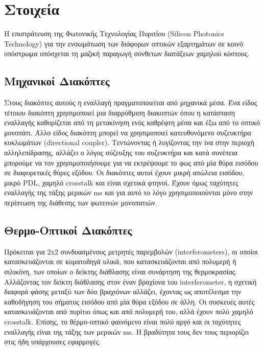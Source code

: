 
\section{Στοιχεία}



Η επιστράτευση της Φωτονικής Τεχνολογίας Πυριτίου (Silicon Photonics
Technology) για την ενσωμάτωση των διάφορων οπτικών εξαρτημάτων σε
κοινό υπόστρωμα υπόσχεται τη μαζική παραγωγή σύνθετων διατάξεων
χαμηλού κόστους.

\subsection{Μηχανικοί Διακόπτες}

Στους διακόπτες αυτούς η εναλλαγή πραγματοποιείται από μηχανικά
μέσα. Ένα είδος τέτοιου διακόπτη χρησιμοποιεί μια διαρρύθμιση
διακοπτών όπου η κατάσταση εναλλαγής καθορίζεται από τη μετακίνηση
ενός καθρέφτη μέσα και έξω από το οπτικό μονοπάτι. Άλλο είδος διακόπτη
μπορεί να χρησιμοποιεί κατευθυνόμενο συζευκτήρα κυκλωμάτων
(directional coupler). Τεντώνοντας ή λυγίζοντας την ίνα στην περιοχή
αλληλεπίδρασης, αλλάζει ο λόγος σύζευξης του συζευκτήρα και κατά
συνέπεια μπορούμε να τον χρησιμοποιήσουμε για να εκτρέψουμε το φως από
μία θύρα εισόδου σε διαφορετικές θύρες εξόδου. Οι διακόπτες αυτοί
έχουν μικρή απώλεια εισόδου, μικρό PDL, χαμηλό crosstalk και είναι
σχετικά φτηνοί. Έχουν όμως ταχύτητες εναλλαγής της τάξης μερικών ms
και για αυτό το λόγο χρησιμοποιούνται μόνο στην περίπτωση της διάθεσης
των φωτεινών μονοπατιών.

\subsection{Θερμο-Οπτικοί Διακόπτες}

Πρόκειται για 2x2 συνδυασμένους μετρητές παρεμβολών (interferometers),
οι οποίοι κατασκευάζονται σε κυματοδηγά υλικά, που κατασκευάζονται από
πολυμερή ή σιλικόνη, των οποίων ο δείκτης διάθλασης είναι συνάρτηση
της θερμοκρασίας. Αλλάζοντας τον δείκτη διάθλασης στον έναν βραχίονα
του interferometer, η σχετική διαφορά φάσης μεταξύ των δύο βραχιόνων
αλλάζει, έχοντας ως αποτέλεσμα την καθοδήγηση του σήματος εισόδου από
μία θύρα εξόδου σε άλλη.  Οι συσκευές αυτές κατασκευάζονται από
πυρίτιο όπως και από πολυμερή του, αλλά έχουν πολύ χαμηλό
crosstalk. Επίσης, το θέρμο-οπτικό φαινόμενο είναι πολύ αργό και οι
ταχύτητες εναλλαγής είναι της τάξης των μερικών ms. Η βραδύτητα τους
δεν τους περιορίζει στις ήδη υπάρχουσες εφαρμογές.

